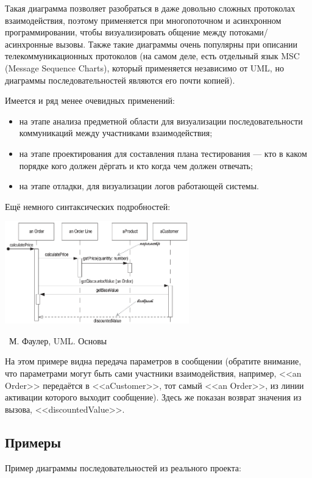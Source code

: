 \documentclass[a5paper]{article}
\newcommand{\attribution}[1] {
	\vspace{-5mm}\begin{flushright}\begin{scriptsize}%
	{\textcopyright\, #1}\end{scriptsize}\end{flushright}
}
\begin{document}
Такая диаграмма позволяет разобраться в даже довольно сложных протоколах взаимодействия, поэтому применяется при многопоточном и асинхронном программировании, чтобы визуализировать общение между потоками/асинхронные вызовы. Также такие диаграммы очень популярны при описании телекоммуникационных протоколов (на самом деле, есть отдельный язык MSC (Message Sequence Charts), который применяется независимо от UML, но диаграммы последовательностей являются его почти копией).

Имеется и ряд менее очевидных применений: 

\begin{itemize}
	\item на этапе анализа предметной области для визуализации последовательности коммуникаций между участниками взаимодействия;
	\item на этапе проектирования для составления плана тестирования --- кто в каком порядке кого должен дёргать и кто когда чем должен отвечать;
	\item на этапе отладки, для визуализации логов работающей системы.
\end{itemize}

Ещё немного синтаксических подробностей:

\begin{center}
	\includegraphics[width=0.6\textwidth]{sequenceDiagramSyntax2.png}
	\attribution{М. Фаулер, UML. Основы}
\end{center}

На этом примере видна передача параметров в сообщении (обратите внимание, что параметрами могут быть сами участники взаимодействия, например, <<an Order>> передаётся в <<aCustomer>>, тот самый <<an Order>>, из линии активации которого выходит сообщение). Здесь же показан возврат значения из вызова, <<discountedValue>>.

\subsection{Примеры}

Пример диаграммы последовательностей из реального проекта:
\end{document}
